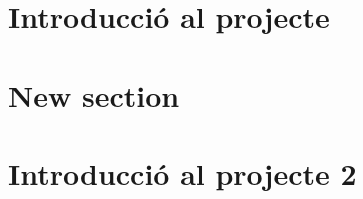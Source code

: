 \chapter{Introducció al projecte}
    

\chapter{New section}
    

    \chapter{Introducció al projecte 2}
        
